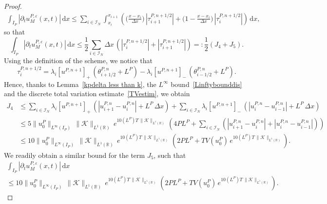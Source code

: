 \documentclass[11pt]{amsart}
\newcommand{\K}{\mathcal{K}}
\newcommand{\dd}{\mathrm{d}}
\newcommand{\R}{\mathbb{R}}
\newcommand{\I}{\mathcal{I}_N}
\newcommand{\eps}{\varepsilon}
\begin{document}
\begin{proof}
\begin{align*}
\int_{I_P} \left|\partial_t u^{P, \eps}_M(x,t)\right| \,\dd x \leq \sum_{i\in\I} \int_{x_i}^{x_{i+1}} \left( \bigg(\frac{x - x_i}{\Delta x}\bigg) \, \left|\tau_{i + 1}^{P, n +1/2}\right|  + \bigg( 1 - \frac{x - x_i}{\Delta x}\bigg) \,\left|\tau_i^{P, n +1/2} \right| \right)\, \dd x,
\end{align*}
so that
\begin{equation*}
\int_{I_P} \left|\partial_t u^{P, \eps}_M(x,t)\right| \,\dd x \leq \frac12 \sum_{i\in\I} \Delta x \, \left(\left|\tau_{i}^{P, n +1/2}\right|+\left|\tau_{i + 1}^{P, n +1/2}\right|\right)=: \frac12(J_4+J_5).
\end{equation*}
Using the definition of the scheme, we notice that
\begin{equation}\label{tau in theta}
\tau_i^{P, n +1/2} = \lambda_i[u^{P, n + 1}]_+ \, \left(\theta_{i +1/2}^{P,n} + L^P\right) - \lambda_i[u^{P,n + 1}]_- \, \left(\theta_{i-1/2}^{P, n} + L^P\right).
\end{equation}
Hence, thanks to Lemma~\ref{kpdelta less than k}, the $L^\infty$ bound~\eqref{Linftybounddis} and the discrete total variation estimate~\eqref{TVestim}, we obtain
\begin{align*}
J_4 &\leq \sum_{i\in\I} \lambda_i[u^{P,n+1}]_+ \, \left(\left|u^{P,n}_{i+1}-u^{P,n}_i\right|+ L^P \, \Delta x\right) + \sum_{i\in\I} \lambda_i[u^{P,n+1}]_- \, \left(\left|u^{P,n}_i-u^{P,n}_{i-1}\right| + L^P \, \Delta x \right)\\
&\leq 5 \|u^P_0\|_{L^\infty(I_P)} \, \|\K\|_{L^1(\R)} \, e^{10(L^P)T \, \|\K\|_{L^1(\R)}} \, \left(4PL^P + \sum_{i\in\I} \left(\left|u^{P,n}_{i+1}-u^{P,n}_i\right|+\left|u^{P,n}_i-u^{P,n}_{i-1}\right|\right)\right)\\
&\leq 10 \|u^P_0\|_{L^\infty(I_P)} \, \|\K\|_{L^1(\R)} \, e^{10(L^P)T \, \|\K\|_{L^1(\R)}} \, \left(2PL^P + TV(u^P_0) \, e^{10(L^P)T \, \|\K\|_{L^1(\R)}} \right).
\end{align*}
We readily obtain a similar bound for the term $J_5$, such that
\begin{equation}\begin{array}{ll}\label{ut}
\displaystyle\int_{I_P} \left|\partial_t u^{P, \eps}_M(x,t)\right| \,\dd x \\\leq  10 \|u^P_0\|_{L^\infty(I_P)} \, \|\K\|_{L^1(\R)} \, e^{10(L^P)T \, \|\K\|_{L^1(\R)}} \, \left(2PL^P + TV(u^P_0) \, e^{10(L^P)T \, \|\K\|_{L^1(\R)}} \right).
\end{array}\end{equation}

\end{proof}
\end{document}
